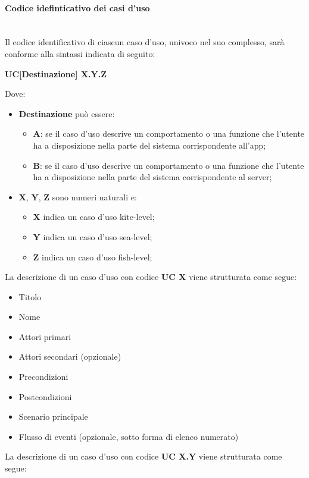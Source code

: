 \paragraph{Codice idefinticativo dei casi d'uso}\mbox{}\\
Il codice identificativo di ciascun caso d’uso, univoco nel suo complesso, sarà conforme alla sintassi indicata di seguito:
\begin{center}
	\textbf{UC[Destinazione] X.Y.Z}
\end{center}
Dove:
\begin{itemize}
	\item \textbf{Destinazione} può essere:
	\begin{itemize}
		\item \textbf{A}: se il caso d’uso descrive un comportamento o una funzione che l’utente ha a disposizione nella parte del sistema corrispondente all’app;
		\item \textbf{B}: se il caso d’uso descrive un comportamento o una funzione che l’utente ha a disposizione nella parte del sistema corrispondente al server;
	\end{itemize}
	\item \textbf{X}, \textbf{Y}, \textbf{Z} sono numeri naturali e:
	\begin{itemize}
		\item \textbf{X} indica un caso d’uso kite-level;
		\item \textbf{Y} indica un caso d’uso sea-level;
		\item \textbf{Z} indica un caso d’uso fish-level;
	\end{itemize}
\end{itemize}
La descrizione di un caso d’uso con codice \textbf{UC X} viene strutturata come segue:
\begin{itemize}
	\item Titolo
	\item Nome
	\item Attori primari
	\item Attori secondari (opzionale)
	\item Precondizioni
	\item Postcondizioni
	\item Scenario principale
	\item Flusso di eventi (opzionale, sotto forma di elenco numerato)	
\end{itemize}
La descrizione di un caso d’uso con codice \textbf{UC X.Y} viene strutturata come segue:
